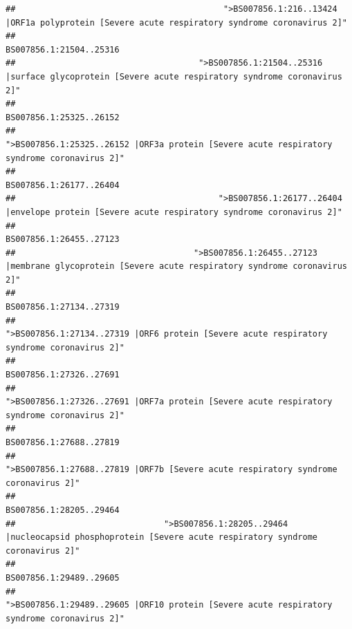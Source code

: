 \documentclass[
]{article}
\begin{document}
\begin{verbatim}
##                                          ">BS007856.1:216..13424 |ORF1a polyprotein [Severe acute respiratory syndrome coronavirus 2]" 
##                                                                                                                BS007856.1:21504..25316 
##                                     ">BS007856.1:21504..25316 |surface glycoprotein [Severe acute respiratory syndrome coronavirus 2]" 
##                                                                                                                BS007856.1:25325..26152 
##                                            ">BS007856.1:25325..26152 |ORF3a protein [Severe acute respiratory syndrome coronavirus 2]" 
##                                                                                                                BS007856.1:26177..26404 
##                                         ">BS007856.1:26177..26404 |envelope protein [Severe acute respiratory syndrome coronavirus 2]" 
##                                                                                                                BS007856.1:26455..27123 
##                                    ">BS007856.1:26455..27123 |membrane glycoprotein [Severe acute respiratory syndrome coronavirus 2]" 
##                                                                                                                BS007856.1:27134..27319 
##                                             ">BS007856.1:27134..27319 |ORF6 protein [Severe acute respiratory syndrome coronavirus 2]" 
##                                                                                                                BS007856.1:27326..27691 
##                                            ">BS007856.1:27326..27691 |ORF7a protein [Severe acute respiratory syndrome coronavirus 2]" 
##                                                                                                                BS007856.1:27688..27819 
##                                                    ">BS007856.1:27688..27819 |ORF7b [Severe acute respiratory syndrome coronavirus 2]" 
##                                                                                                                BS007856.1:28205..29464 
##                              ">BS007856.1:28205..29464 |nucleocapsid phosphoprotein [Severe acute respiratory syndrome coronavirus 2]" 
##                                                                                                                BS007856.1:29489..29605 
##                                            ">BS007856.1:29489..29605 |ORF10 protein [Severe acute respiratory syndrome coronavirus 2]" 

\end{verbatim}
\end{document}
